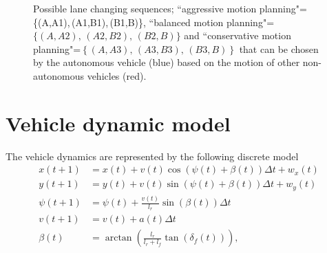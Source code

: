 \documentclass[10pt,journal]{IEEEtran}
\begin{document}
\begin{figure}
\begin{centering}
			\par
		\end{centering}
	\protect\caption{Possible lane changing sequences; ``aggressive motion planning"= \{(A,A1),\,(A1,B1),\,(B1,B)\}, ``balanced motion planning"=$\{\left(A,A2\right),\,\left(A2,B2\right),\,\left(B2,B\right)\}$ and ``conservative motion planning"=$\left\{\left(A,A3\right),\,\left(A3,B3\right),\,\left(B3,B\right)\right\}$ that can be chosen by the autonomous vehicle (blue) based on the motion of other non-autonomous vehicles (red).}
	\label{fig:lane_changing}
	\end{figure}
	
	

	\section{Vehicle dynamic model}
	\label{sec:model}

	The  vehicle dynamics are represented by the following discrete model \cite{Kong2015}
	\begin{subequations}
		\begin{align}
			x\left(t+1\right) & = 	x\left(t\right) + v\left(t\right) \cos\left(\psi \left(t\right) + \beta \left(t\right) \right) \Delta t + w_x\left(t\right)\\ 
			y\left(t+1\right) & = 	y\left(t\right) + v\left(t\right) \sin\left(\psi \left(t\right) + \beta \left(t\right) \right) \Delta t + w_y\left(t\right) \\ 
			\psi\left(t+1\right) & = 	\psi\left(t\right) + \frac{v\left(t\right)}{l_r} \sin\left( \beta \left(t\right) \right) \Delta t \\ 
			v\left(t+1\right) & = 	v\left(t\right) + a\left(t\right)  \Delta t\\
			\beta\left(t\right) & = \arctan\left(\frac{l_r}{l_r+l_f}\tan\left(\delta_f\left(t\right)\right)\right),
		\end{align}
	\label{eq:mod}
	\end{subequations}
\end{document}

